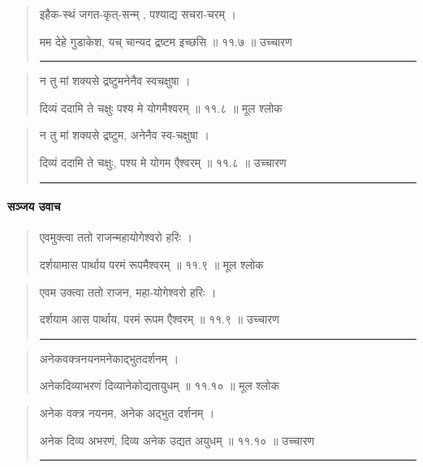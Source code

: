 \begin{quotation}

इहैक-स्थं जगत-कृत्-सन्म् , पश्याद्य सचरा-चरम्‌  ।  

मम देहे गुडाकेश, यच् चान्यद द्रष्टम इच्छसि  ॥ ११.७ ॥  उच्चारण

\noindent\rule{16cm}{0.4pt} 
\end{quotation}


\begin{quotation} 

न तु मां शक्यसे द्रष्टुमनेनैव स्वचक्षुषा ।  

दिव्यं ददामि ते चक्षुः पश्य मे योगमैश्वरम्  ॥ ११.८ ॥  मूल श्लोक
\end{quotation}

\begin{quotation}

न तु मां शक्यसे द्रष्टुम, अनेनैव स्व-चक्षुषा  ।  

दिव्यं ददामि ते चक्षुः, पश्य मे योगम एैश्वरम्‌  ॥ ११.८ ॥  उच्चारण

\noindent\rule{16cm}{0.4pt} 
\end{quotation}


\paragraph{\sanskrit सञ्जय उवाच}
\begin{quotation} 


एवमुक्त्वा ततो राजन्महायोगेश्वरो हरिः ।  

दर्शयामास पार्थाय परमं रूपमैश्वरम्  ॥ ११.९ ॥  मूल श्लोक
\end{quotation}

\begin{quotation}

एवम उक्त्वा ततो राजन, महा-योगेश्वरो हरिः  ।  

दर्शयाम आस पार्थाय, परमं रूपम एैश्वरम्  ॥ ११.९ ॥  उच्चारण

\noindent\rule{16cm}{0.4pt} 
\end{quotation}

\begin{quotation} 

अनेकवक्त्रनयनमनेकाद्भुतदर्शनम्‌  ।  

अनेकदिव्याभरणं दिव्यानेकोद्यतायुधम्‌  ॥ ११.१० ॥  मूल श्लोक
\end{quotation}

\begin{quotation}

अनेक वक्त्र नयनम, अनेक अद्भुत दर्शनम्‌  ।  

अनेक दिव्य अभरणं, दिव्य अनेक उद्यत अयुधम्‌  ॥ ११.१० ॥  उच्चारण

\noindent\rule{16cm}{0.4pt} 
\end{quotation}

